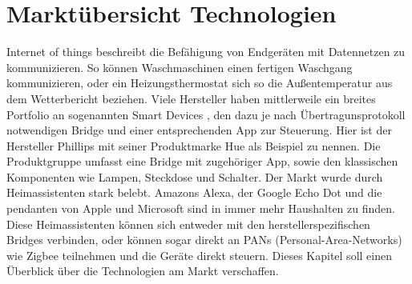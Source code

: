 \chapter{Marktübersicht Technologien}

\grqq Internet of things \grqq{} beschreibt die Befähigung von Endgeräten mit Datennetzen zu kommunizieren. So können Waschmaschinen einen fertigen Waschgang kommunizieren,
oder ein Heizungsthermostat sich so die Außentemperatur aus dem Wetterbericht beziehen. Viele Hersteller haben mittlerweile ein breites Portfolio an sogenannten \grqq Smart Devices \grqq{}, den dazu
je nach Übertragunsprotokoll notwendigen \grqq Bridge \grqq{} und einer entsprechenden App zur Steuerung. Hier ist der Hersteller Phillips mit seiner Produktmarke \grqq Hue \grqq{}
als Beispiel zu nennen. Die Produktgruppe umfasst eine Bridge mit zugehöriger App, sowie den klassischen Komponenten wie Lampen, Steckdose und Schalter.
Der Markt wurde durch Heimassistenten stark belebt. Amazons Alexa, der Google Echo Dot und die pendanten von Apple und Microsoft sind in immer mehr Haushalten zu finden.
Diese Heimassistenten können sich entweder mit den herstellerspezifischen Bridges verbinden, oder können sogar direkt an PANs (Personal-Area-Networks) wie Zigbee
teilnehmen und die Geräte direkt steuern. Dieses Kapitel soll einen Überblick über die Technologien am Markt verschaffen. 

